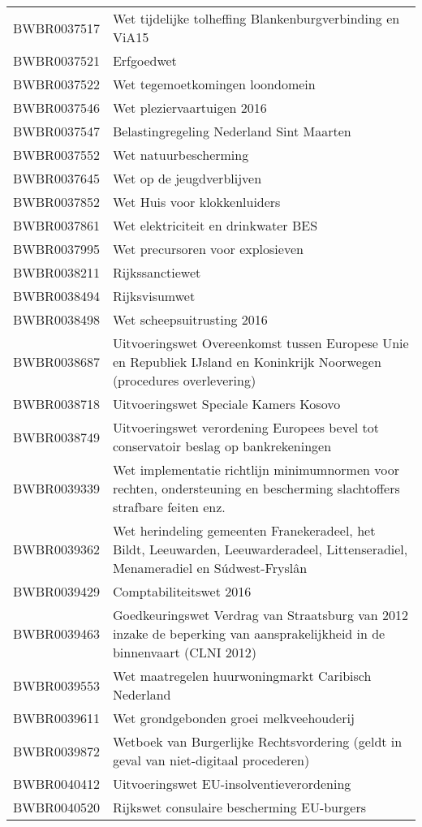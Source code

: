 \begin{longtable}{lp{}}
BWBR0037517 & Wet tijdelijke tolheffing Blankenburgverbinding en ViA15 \\
BWBR0037521 & Erfgoedwet \\
BWBR0037522 & Wet tegemoetkomingen loondomein \\
BWBR0037546 & Wet pleziervaartuigen 2016 \\
BWBR0037547 & Belastingregeling Nederland Sint Maarten \\
BWBR0037552 & Wet natuurbescherming \\
BWBR0037645 & Wet op de jeugdverblijven \\
BWBR0037852 & Wet Huis voor klokkenluiders \\
BWBR0037861 & Wet elektriciteit en drinkwater BES \\
BWBR0037995 & Wet precursoren voor explosieven \\
BWBR0038211 & Rijkssanctiewet \\
BWBR0038494 & Rijksvisumwet \\
BWBR0038498 & Wet scheepsuitrusting 2016 \\
BWBR0038687 & Uitvoeringswet Overeenkomst tussen Europese Unie en Republiek IJsland en Koninkrijk Noorwegen (procedures overlevering) \\
BWBR0038718 & Uitvoeringswet Speciale Kamers Kosovo \\
BWBR0038749 & Uitvoeringswet verordening Europees bevel tot conservatoir beslag op bankrekeningen \\
BWBR0039339 & Wet implementatie richtlijn minimumnormen voor rechten, ondersteuning en bescherming slachtoffers strafbare feiten enz. \\
BWBR0039362 & Wet herindeling gemeenten Franekeradeel, het Bildt, Leeuwarden, Leeuwarderadeel, Littenseradiel, Menameradiel en Súdwest-Fryslân \\
BWBR0039429 & Comptabiliteitswet 2016 \\
BWBR0039463 & Goedkeuringswet Verdrag van Straatsburg van 2012 inzake de beperking van aansprakelijkheid in de binnenvaart (CLNI 2012) \\
BWBR0039553 & Wet maatregelen huurwoningmarkt Caribisch Nederland \\
BWBR0039611 & Wet grondgebonden groei melkveehouderij \\
BWBR0039872 & Wetboek van Burgerlijke Rechtsvordering (geldt in geval van niet-digitaal procederen) \\
BWBR0040412 & Uitvoeringswet EU-insolventieverordening \\
BWBR0040520 & Rijkswet consulaire bescherming EU-burgers \\

\end{longtable}
